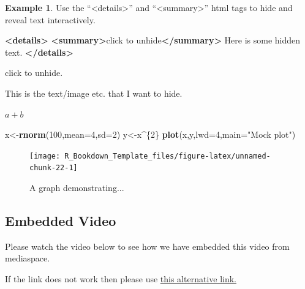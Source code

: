 \documentclass[
]{article}
\newenvironment{Shaded}{\begin{snugshade}}{\end{snugshade}}
\newcommand{\AttributeTok}[1]{\textcolor[rgb]{0.13,0.29,0.53}{#1}}
\newcommand{\DecValTok}[1]{\textcolor[rgb]{0.00,0.00,0.81}{#1}}
\newcommand{\FunctionTok}[1]{\textcolor[rgb]{0.13,0.29,0.53}{\textbf{#1}}}
\newcommand{\KeywordTok}[1]{\textcolor[rgb]{0.13,0.29,0.53}{\textbf{#1}}}
\newcommand{\NormalTok}[1]{#1}
\newcommand{\OtherTok}[1]{\textcolor[rgb]{0.56,0.35,0.01}{#1}}
\newcommand{\SpecialCharTok}[1]{\textcolor[rgb]{0.81,0.36,0.00}{\textbf{#1}}}
\newcommand{\StringTok}[1]{\textcolor[rgb]{0.31,0.60,0.02}{#1}}
\numberwithin{equation}{section}
\numberwithin{figure}{section}
\theoremstyle{break}
\theoremstyle{definition}
\theoremstyle{definition}
\newtheorem{example}{Example}[section]
\theoremstyle{definition}
\theoremstyle{definition}
\theoremstyle{remark}
\begin{document}
\begin{example}

Use the ``\textless details\textgreater{}'' and ``\textless summary\textgreater{}'' html tags to hide and reveal text interactively.

\begin{Shaded}
\begin{Highlighting}[]
\KeywordTok{\textless{}details\textgreater{}}
  \KeywordTok{\textless{}summary\textgreater{}}\NormalTok{click to unhide}\KeywordTok{\textless{}/summary\textgreater{}}
\NormalTok{  Here is some hidden text.}
\KeywordTok{\textless{}/details\textgreater{}}
\end{Highlighting}
\end{Shaded}

click to unhide.

This is the text/image etc. that I want to hide.

\(a+b\)

\begin{Shaded}
\begin{Highlighting}[]
\NormalTok{x}\OtherTok{\textless{}{-}}\FunctionTok{rnorm}\NormalTok{(}\DecValTok{100}\NormalTok{,}\AttributeTok{mean=}\DecValTok{4}\NormalTok{,}\AttributeTok{sd=}\DecValTok{2}\NormalTok{)}
\NormalTok{y}\OtherTok{\textless{}{-}}\NormalTok{x}\SpecialCharTok{\^{}}\NormalTok{\{}\DecValTok{2}\NormalTok{\}}
\FunctionTok{plot}\NormalTok{(x,y,}\AttributeTok{lwd=}\DecValTok{4}\NormalTok{,}\AttributeTok{main=}\StringTok{"Mock plot"}\NormalTok{)}
\end{Highlighting}
\end{Shaded}

\begin{figure}
\texttt{[image: R\_Bookdown\_Template\_files/figure-latex/unnamed-chunk-22-1]} \caption{A graph demonstrating...}\label{fig:unnamed-chunk-22}
\end{figure}

\end{example}

\hypertarget{embedded-video}{%
\subsection{Embedded Video}\label{embedded-video}}

Please watch the video below to see how we have embedded this video from mediaspace.

If the link does not work then please use \href{https://mediaspace.nottingham.ac.uk/media/How+to+get+the+embed+links/1_824b1mfn}{this alternative link.}
\end{document}
